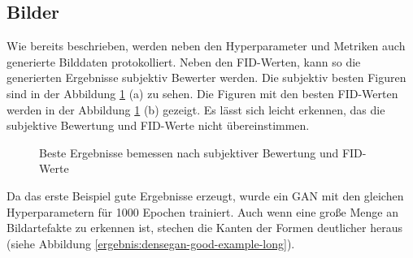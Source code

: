 \subsection{Bilder}
Wie bereits beschrieben, werden neben den Hyperparameter und Metriken auch generierte Bilddaten protokolliert.
Neben den FID-Werten, kann so die generierten Ergebnisse subjektiv Bewerter werden.
Die subjektiv besten Figuren sind in der Abbildung \ref{ergebnis:densegan-best} (a) zu sehen.
Die Figuren mit den besten FID-Werten werden in der Abbildung  \ref{ergebnis:densegan-best} (b) gezeigt.
Es lässt sich leicht erkennen, das die subjektive Bewertung und FID-Werte nicht übereinstimmen.

\begin{figure}[H]
	\centering
	\qquad
	\caption{Beste Ergebnisse bemessen nach subjektiver Bewertung und FID-Werte}
	\label{ergebnis:densegan-best}
\end{figure}

Da das erste Beispiel gute Ergebnisse erzeugt, wurde ein GAN mit den gleichen Hyperparametern für 1000 Epochen trainiert.
Auch wenn eine große Menge an Bildartefakte zu erkennen ist, stechen die Kanten der Formen deutlicher heraus (siehe Abbildung \ref{ergebnis:densegan-good-example-long}).

